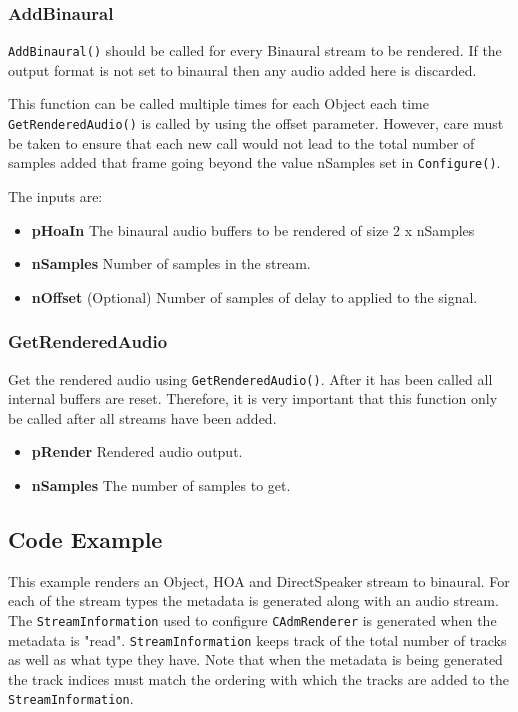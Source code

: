 \documentclass[12pt]{report}
\newcommand{\code}[1]{\texttt{#1}}
\begin{document}
\subsubsection{AddBinaural}

\code{AddBinaural()} should be called for every Binaural stream to be rendered. If the output format is not set to binaural then any audio added here is discarded.

This function can be called multiple times for each Object each time \code{GetRenderedAudio()} is called by using the offset parameter.
However, care must be taken to ensure that each new call would not lead to the total number of samples added that frame going beyond the value nSamples set in \code{Configure()}.

The inputs are:
\begin{itemize}
    \item \textbf{pHoaIn} The binaural audio buffers to be rendered of size 2 x nSamples
    \item \textbf{nSamples} Number of samples in the stream.
    \item \textbf{nOffset} (Optional) Number of samples of delay to applied to the signal.
\end{itemize}

\subsubsection{GetRenderedAudio}

Get the rendered audio using \code{GetRenderedAudio()}.
After it has been called all internal buffers are reset.
Therefore, it is very important that this function only be called after all streams have been added.
\begin{itemize}
    \item \textbf{pRender} Rendered audio output.
    \item \textbf{nSamples} The number of samples to get.
\end{itemize}

\subsection{Code Example}\label{AdmFullCodeExample}

This example renders an Object, HOA and DirectSpeaker stream to binaural.
For each of the stream types the metadata is generated along with an audio stream.
The \code{StreamInformation} used to configure \code{CAdmRenderer} is generated when the metadata is "read".
\code{StreamInformation} keeps track of the total number of tracks as well as what type they have.
Note that when the metadata is being generated the track indices must match the ordering with which the tracks are added to the \code{StreamInformation}.
\end{document}
